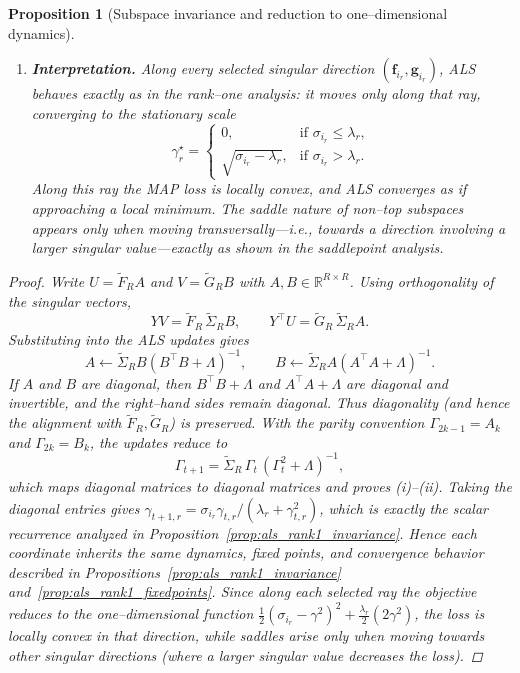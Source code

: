 \documentclass[11pt]{article}
\theoremstyle{spaced}
\newtheorem{proposition}{Proposition}
\begin{document}
\begin{proposition}[Subspace invariance and reduction to one--dimensional dynamics]
\begin{enumerate}[label=(\roman*)]
\item \textbf{Interpretation.}
Along every selected singular direction $(\mathbf{f}_{i_r},\mathbf{g}_{i_r})$, ALS behaves exactly as in the rank--one analysis: it moves only along that ray, converging to the stationary scale
\[
\gamma_{r}^\star = 
\begin{cases}
0, & \text{if }\sigma_{i_r}\le\lambda_r,\\[3pt]
\sqrt{\sigma_{i_r}-\lambda_r}, & \text{if }\sigma_{i_r}>\lambda_r.
\end{cases}
\]
Along this ray the MAP loss is locally convex, and ALS converges as if approaching a local minimum. 
The saddle nature of non--top subspaces appears only when moving transversally---i.e., towards a direction involving a larger singular value---exactly as shown in the saddlepoint analysis.
\end{enumerate}

\begin{proof}
Write $U = \tilde F_R A$ and $V = \tilde G_R B$ with $A,B\in\mathbb{R}^{R\times R}$. 
Using orthogonality of the singular vectors,
\[
YV = \tilde F_R\,\tilde\Sigma_R B,\qquad
Y^\top U = \tilde G_R\,\tilde\Sigma_R A.
\]
Substituting into the ALS updates gives
\[
A \leftarrow \tilde\Sigma_R B(B^\top B+\Lambda)^{-1},\qquad
B \leftarrow \tilde\Sigma_R A(A^\top A+\Lambda)^{-1}.
\]
If $A$ and $B$ are diagonal, then $B^\top B+\Lambda$ and $A^\top A+\Lambda$ are diagonal and invertible, and the right--hand sides remain diagonal. 
Thus diagonality (and hence the alignment with $\tilde F_R,\tilde G_R$) is preserved. 
With the parity convention $\Gamma_{2k-1}=A_k$ and $\Gamma_{2k}=B_k$, the updates reduce to
\[
\Gamma_{t+1}
= \tilde\Sigma_R\,\Gamma_t\,(\Gamma_t^2+\Lambda)^{-1},
\]
which maps diagonal matrices to diagonal matrices and proves (i)--(ii). 
Taking the diagonal entries gives
$\gamma_{t+1,r} = \sigma_{i_r}\gamma_{t,r}/(\lambda_r+\gamma_{t,r}^2)$,
which is exactly the scalar recurrence analyzed in Proposition~\ref{prop:als_rank1_invariance}. 
Hence each coordinate inherits the same dynamics, fixed points, and convergence behavior described in Propositions~\ref{prop:als_rank1_invariance} and~\ref{prop:als_rank1_fixedpoints}.
Since along each selected ray the objective reduces to the one--dimensional function
$\tfrac12(\sigma_{i_r}-\gamma^2)^2+\tfrac{\lambda_r}{2}(2\gamma^2)$,
the loss is locally convex in that direction, while saddles arise only when moving towards other singular directions (where a larger singular value decreases the loss).
\end{proof}
\end{proposition}
\end{document}
